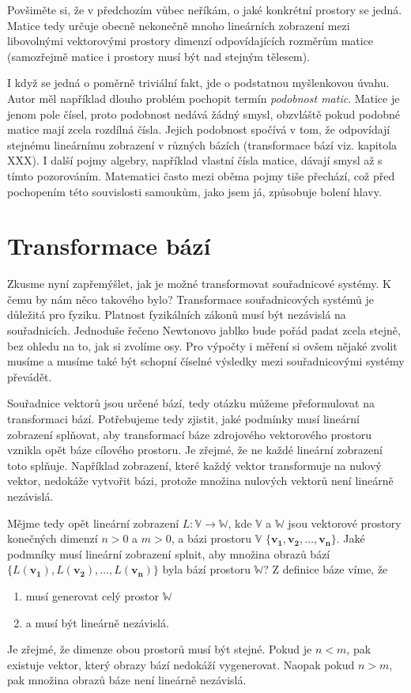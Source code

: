 \documentclass[a5paper,12pt]{amsbook}
\theoremstyle{definition}
\newcommand{\myvec}[1]{\mathbf{#1}}
\newcommand{\myspace}[1]{\mathbb{#1}}
\newcommand{\mymap}[1]{#1}
\begin{document}
Povšiměte si, že v předchozím vůbec neříkám, o jaké konkrétní prostory se jedná. Matice tedy
určuje obecně nekonečně mnoho lineárních zobrazení mezi libovolnými vektorovými prostory dimenzí
odpovídajících rozměrům matice (samozřejmě matice i prostory musí být nad stejným tělesem).

I když se jedná o poměrně triviální fakt, jde o podstatnou myšlenkovou úvahu.
Autor měl například dlouho problém pochopit termín \textit{podobnost matic}. Matice je jenom
pole čísel, proto podobnost nedává žádný smysl, obzvláště pokud podobné matice mají zcela
rozdílná čísla. Jejich podobnost spočívá v tom, že odpovídají stejnému lineárnímu zobrazení
v různých bázích (transformace bází viz. kapitola XXX). I další pojmy algebry, například vlastní
čísla matice, dávají smysl až s tímto pozorováním. Matematici často mezi oběma pojmy tiše přechází,
což před pochopením této souvislosti samoukům, jako jsem já, způsobuje bolení hlavy.

\section{Transformace bází}

\noindent Zkusme nyní zapřemýšlet, jak je možné transformovat souřadnicové systémy.  K čemu by nám
něco takového bylo? Transformace souřadnicových systémů je důležitá pro fyziku. Platnost
fyzikálních zákonů musí být nezávislá na souřadnicích. Jednoduše řečeno Newtonovo jablko bude
pořád padat zcela stejně, bez ohledu na to, jak si zvolíme osy. Pro výpočty i měření si ovšem
nějaké zvolit musíme a musíme také být schopní číselné výsledky mezi souřadnicovými systémy
převádět.

Souřadnice vektorů jsou určené bází, tedy otázku můžeme přeformulovat na transformaci bází.
Potřebujeme tedy zjistit, jaké podmínky musí lineární zobrazení splňovat, aby transformací
báze zdrojového vektorového prostoru vznikla opět báze cílového prostoru. Je zřejmé, že ne každé
lineární zobrazení toto splňuje. Například zobrazení, které každý vektor transformuje na nulový
vektor, nedokáže vytvořit bázi, protože množina nulových vektorů není lineárně nezávislá.

Mějme tedy opět lineární zobrazení $\mymap{L}: \myspace{V}\rightarrow\myspace{W}$, kde $\myspace{V}$
a $\myspace{W}$ jsou vektorové prostory konečných dimenzí $n > 0$ a $m > 0$, a bázi prostoru $\myspace{V}$
$\{\myvec{v_1}, \myvec{v_2}, \ldots, \myvec{v_n}\}$. Jaké podmníky musí lineární zobrazení
splnit, aby množina obrazů bází $\{\mymap{L}(\myvec{v_1}), \mymap{L}(\myvec{v_2}), \ldots, 
\mymap{L}(\myvec{v_n})\}$ byla bází prostoru $\myspace{W}$? Z definice báze víme, že
\begin{enumerate}
  \item musí generovat celý prostor $\myspace{W}$
  \item a musí být lineárně nezávislá.
\end{enumerate}
Je zřejmé, že dimenze obou prostorů musí být stejné. Pokud je $n < m$, pak existuje vektor, který
obrazy bází nedokáží vygenerovat. Naopak pokud $n > m$, pak množina obrazů báze není lineárně
nezávislá.
\end{document}

